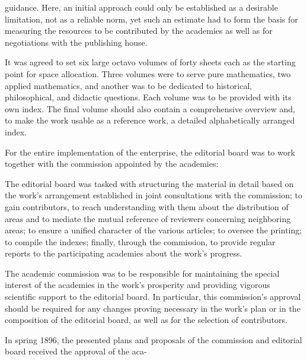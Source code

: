 \thispagestyle{fancy}

\vspace{0.5cm}

guidance. Here, an initial approach could only be established as a desirable limitation, not as a reliable norm, yet such an estimate had to form the basis for measuring the resources to be contributed by the academies as well as for negotiations with the publishing house.

It was agreed to set six large octavo volumes of forty sheets each as the starting point for space allocation. Three volumes were to serve pure mathematics, two applied mathematics, and another was to be dedicated to historical, philosophical, and didactic questions. Each volume was to be provided with its own index. The final volume should also contain a comprehensive overview and, to make the work usable as a reference work, a detailed alphabetically arranged index.

For the entire implementation of the enterprise, the editorial board was to work together with the commission appointed by the academies:

The editorial board was tasked with structuring the material in detail based on the work's arrangement established in joint consultations with the commission; to gain contributors, to reach understanding with them about the distribution of areas and to mediate the mutual reference of reviewers concerning neighboring areas; to ensure a unified character of the various articles; to oversee the printing; to compile the indexes; finally, through the commission, to provide regular reports to the participating academies about the work's progress.

The academic commission was to be responsible for maintaining the special interest of the academies in the work's prosperity and providing vigorous scientific support to the editorial board. In particular, this commission's approval should be required for any changes proving necessary in the work's plan or in the composition of the editorial board, as well as for the selection of contributors.

In spring 1896, the presented plans and proposals of the commission and editorial board received the approval of the aca-
